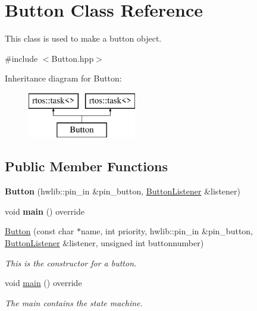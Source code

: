 \hypertarget{class_button}{}\section{Button Class Reference}
\label{class_button}


This class is used to make a button object.  




{\ttfamily \#include $<$Button.\+hpp$>$}

Inheritance diagram for Button\+:\begin{figure}[H]
\begin{center}
\leavevmode
\includegraphics[height=2.000000cm]{class_button}
\end{center}
\end{figure}
\subsection*{Public Member Functions}
\begin{DoxyCompactItemize}
\item 
\mbox{\label{class_button_a80936947d8417cfa53fcc22fdb867f96}} 
{\bfseries Button} (hwlib\+::pin\+\_\+in \&pin\+\_\+button, \mbox{\hyperlink{class_button_listener}{Button\+Listener}} \&listener)
\item 
\mbox{\label{class_button_a4cc671cc425acd0ee1b8f2f437cf40db}} 
void {\bfseries main} () override
\item 
\mbox{\hyperlink{class_button_a7771486e8e6649ee30c85ab5580796da}{Button}} (const char $\ast$name, int priority, hwlib\+::pin\+\_\+in \&pin\+\_\+button, \mbox{\hyperlink{class_button_listener}{Button\+Listener}} \&listener, unsigned int buttonnumber)
\begin{DoxyCompactList}\small\item\em This is the constructor for a button. \end{DoxyCompactList}\item 
void \mbox{\hyperlink{class_button_a4cc671cc425acd0ee1b8f2f437cf40db}{main}} () override
\begin{DoxyCompactList}\small\item\em The main contains the state machine. \end{DoxyCompactList}\end{DoxyCompactItemize}


